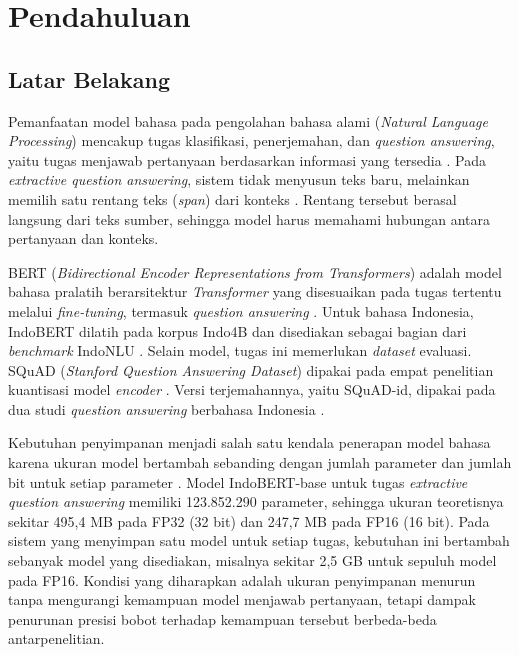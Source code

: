 %
%
%
%
%

\chapter{Pendahuluan}

\section{Latar Belakang}

Pemanfaatan model bahasa pada pengolahan bahasa alami (\textit{Natural Language Processing}) mencakup tugas klasifikasi, penerjemahan, dan \textit{question answering}, yaitu tugas menjawab pertanyaan berdasarkan informasi yang tersedia \parencite{jurafsky2025speech}. Pada \textit{extractive question answering}, sistem tidak menyusun teks baru, melainkan memilih satu rentang teks (\textit{span}) dari konteks \parencite{jurafsky2025speech}. Rentang tersebut berasal langsung dari teks sumber, sehingga model harus memahami hubungan antara pertanyaan dan konteks.

BERT (\textit{Bidirectional Encoder Representations from Transformers}) adalah model bahasa pralatih berarsitektur \textit{Transformer} yang disesuaikan pada tugas tertentu melalui \textit{fine-tuning}, termasuk \textit{question answering} \parencite{devlin2019bert}. Untuk bahasa Indonesia, IndoBERT dilatih pada korpus Indo4B dan disediakan sebagai bagian dari \textit{benchmark} IndoNLU \parencite{wilie2020indonlu}. Selain model, tugas ini memerlukan \textit{dataset} evaluasi. SQuAD (\textit{Stanford Question Answering Dataset}) dipakai pada empat penelitian kuantisasi model \textit{encoder} \parencite{bai2022towards, guo2023olive, wei2022outlier, zadeh2022mokey}. Versi terjemahannya, yaitu SQuAD-id, dipakai pada dua studi \textit{question answering} berbahasa Indonesia \parencite{ramaputra2026evaluating, suhendra2026matrik}.

Kebutuhan penyimpanan menjadi salah satu kendala penerapan model bahasa karena ukuran model bertambah sebanding dengan jumlah parameter dan jumlah bit untuk setiap parameter \parencite{gholami2021survey}. Model IndoBERT-base untuk tugas \textit{extractive question answering} memiliki 123.852.290 parameter, sehingga ukuran teoretisnya sekitar 495,4 MB pada FP32 (32 bit) dan 247,7 MB pada FP16 (16 bit). Pada sistem yang menyimpan satu model untuk setiap tugas, kebutuhan ini bertambah sebanyak model yang disediakan, misalnya sekitar 2,5 GB untuk sepuluh model pada FP16. Kondisi yang diharapkan adalah ukuran penyimpanan menurun tanpa mengurangi kemampuan model menjawab pertanyaan, tetapi dampak penurunan presisi bobot terhadap kemampuan tersebut berbeda-beda antarpenelitian.


